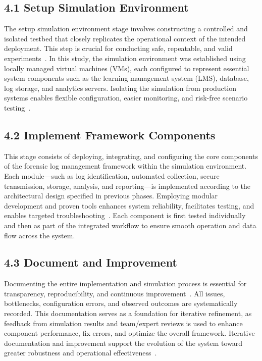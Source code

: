 \subsection{4.1 Setup Simulation Environment}

The setup simulation environment stage involves constructing a controlled and isolated testbed that closely replicates the operational context of the intended deployment. This step is crucial for conducting safe, repeatable, and valid experiments~\cite{sommerville2016software}. In this study, the simulation environment was established using locally managed virtual machines (VMs), each configured to represent essential system components such as the learning management system (LMS), database, log storage, and analytics servers. Isolating the simulation from production systems enables flexible configuration, easier monitoring, and risk-free scenario testing~\cite{bass2012softwarearch}.

\subsection{4.2 Implement Framework Components}

This stage consists of deploying, integrating, and configuring the core components of the forensic log management framework within the simulation environment. Each module—such as log identification, automated collection, secure transmission, storage, analysis, and reporting—is implemented according to the architectural design specified in previous phases. Employing modular development and proven tools enhances system reliability, facilitates testing, and enables targeted troubleshooting~\cite{pressman2015software}. Each component is first tested individually and then as part of the integrated workflow to ensure smooth operation and data flow across the system.

\subsection{4.3 Document and Improvement}

Documenting the entire implementation and simulation process is essential for transparency, reproducibility, and continuous improvement~\cite{hevner2004design}. All issues, bottlenecks, configuration errors, and observed outcomes are systematically recorded. This documentation serves as a foundation for iterative refinement, as feedback from simulation results and team/expert reviews is used to enhance component performance, fix errors, and optimize the overall framework. Iterative documentation and improvement support the evolution of the system toward greater robustness and operational effectiveness~\cite{saunders2019researchmethods}.

